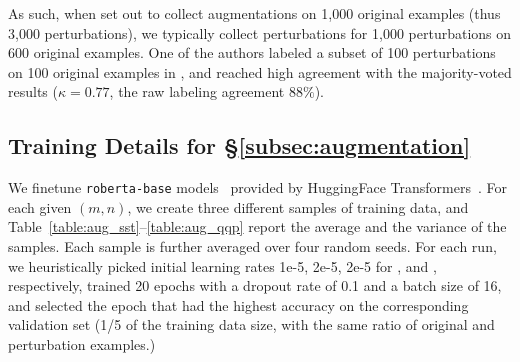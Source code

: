 As such, when set out to collect augmentations on 1,000 original examples (thus 3,000 perturbations), we typically collect perturbations for 1,000 perturbations on 600 original examples.
One of the authors labeled a subset of 100 perturbations on 100 original examples in \sst, and reached high agreement with the majority-voted results ($\kappa=0.77$, the raw labeling agreement $88\%$).


\subsection{Training Details for \S\ref{subsec:augmentation}}
\label{appendix:data_collection}

We finetune \texttt{roberta-base} models~\cite{liu2019roberta} provided by HuggingFace Transformers~\cite{Wolf2019HuggingFacesTS}.
For each given $(m,n)$, we create three different samples of training data, and Table~\ref{table:aug_sst}--\ref{table:aug_qqp} report the average and the variance of the samples.
Each sample is further averaged over four random seeds.
For each run, we heuristically picked initial learning rates 1e-5, 2e-5, 2e-5 for \sst, \nli and \qqp, respectively, trained 20 epochs with a dropout rate of 0.1 and a batch size of 16, and selected the epoch that had the highest accuracy on the corresponding validation set (1/5 of the training data size, with the same ratio of original and perturbation examples.)

